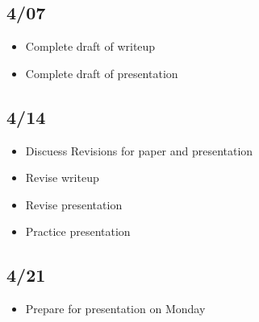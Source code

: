 \documentclass[12pt]{article}
\begin{document}
\subsection*{4/07}
\begin{itemize}
    \item Complete draft of writeup
    \item Complete draft of presentation
\end{itemize}

\subsection*{4/14}
\begin{itemize}
    \item Discuess Revisions for paper and presentation
    \item Revise writeup
    \item Revise presentation
    \item Practice presentation
\end{itemize}

\subsection*{4/21}
\begin{itemize}
    \item Prepare for presentation on Monday
\end{itemize}
\end{document}
